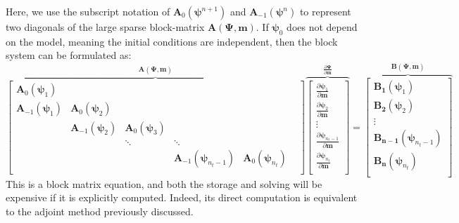 \documentclass[11pt]{article}
\newcommand{\deriv}[2]{\frac{\partial #1}{\partial #2}}
\newcommand{\nn}{^{n+1}}
\newcommand{\n}{^{n}}
\newcommand{\bfA}{\mathbf{A}}
\newcommand{\bfB}{\mathbf{B}}
\newcommand{\bfm}{\mathbf{m}}
\newcommand{\bfpsi}{\boldsymbol{\psi}}
\newcommand{\bfPsi}{\boldsymbol{\Psi}}
\begin{document}
Here, we use the subscript notation of $\bfA_0(\bfpsi\nn)$ and
$\bfA_{-1}(\bfpsi\n)$ to represent two diagonals of the large sparse block-matrix
$\bfA({\bfPsi},\bfm)$.
If $\bfpsi_0$ does not depend on the model, meaning
the initial conditions are independent, then the block system can be
formulated as:
\begin{equation}
\label{eq:jacobian_Time}
\overbrace{
    \left[
    \begin{array}{cccccc}
        \bfA_0(\bfpsi_1)&&&\\
        \bfA_{-1}(\bfpsi_1)&\bfA_0(\bfpsi_2)&&\\
        &\bfA_{-1}(\bfpsi_2)&\bfA_0(\bfpsi_3)&\\
        &&\ddots&\ddots&&\\
        &&&\bfA_{-1}(\bfpsi_{n_{t}-1})&\bfA_0(\bfpsi_{n_{t}})\\
    \end{array}
    \right]
}^{\bfA(\bfPsi,\bfm)}
\overbrace{
    \left[
    \begin{array}{c}
        \deriv{\bfpsi_1}{\bfm}\\
        \deriv{\bfpsi_2}{\bfm}\\
        \vdots\\
        \deriv{\bfpsi_{n_{t}-1}}{\bfm}\\
        \deriv{\bfpsi_{n_{t}}}{\bfm}\\
    \end{array}
    \right]
}^{\deriv{\bfPsi}{\bfm}}
    =
\overbrace{
    \left[
    \begin{array}{c}
        \mathbf{B_1}(\bfpsi_1)\\
        \mathbf{B_2}(\bfpsi_2)\\
        \vdots\\
        \mathbf{B_{n-1}}(\bfpsi_{n_{t}-1})\\
        \mathbf{B_n}(\bfpsi_{n_{t}})\\
    \end{array}
    \right]
}^{\bfB(\bfPsi,\bfm)}
\end{equation}
This is a block matrix equation, and both the storage and
solving will be expensive if it is explicitly computed. Indeed, its direct
computation is equivalent to the adjoint method previously discussed.
\end{document}
